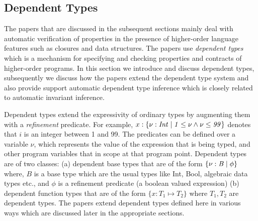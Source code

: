 \newcommand{\dt}[2]{\mathit{\{ #1 \vbar #2\}}}
\newcommand{\subtype}{\mathit{<:}}
\newcommand{\sem}[1]{\sembrack{#1}}

\subsection{Dependent Types}

The papers that are discussed in the subsequent sections mainly deal with 
automatic verification of properties in the presence of higher-order language features such as closures and data structures.
The papers use \emph{dependent types} which is a mechanism for specifying and checking properties and contracts of higher-order programs. In this section we introduce and discuss dependent types, subsequently we discuss how the papers extend the dependent type system and also provide support automatic dependent type inference which is closely related to automatic invariant inference.

Dependent types extend the expressivity of ordinary types by augmenting them with a \emph{refinement} predicate. For example, $x:\dt{\nu: Int}{1 \le \nu \wedge \nu \le 99}$ denotes that $i$ is an integer between 1 and 99. The predicates can be defined over a variable $\nu$, which represents the value of the expression that is being typed, and other program variables that in scope at that program point.
Dependent types are of two classes: (a) dependent base types that are of the form $\dt{\nu:B}{\phi}$ where, $B$ is a base type which are the usual types like Int, Bool, algebraic data types etc., and $\phi$ is a refinement predicate (a boolean valued expression)
(b) dependent function types that are of the form $\{ x:T_1 \mapsto T_2\}$ 
where $T_1,T_2$ are dependent types.
The papers extend dependent types defined here in various ways which are discussed later in the appropriate sections.
 
